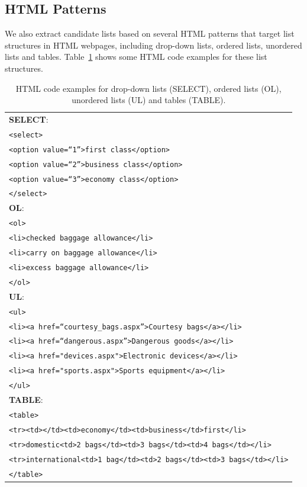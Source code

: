 \subsection{HTML Patterns}
We also extract candidate lists based on several HTML patterns that target list structures in HTML webpages, including drop-down lists, ordered lists, unordered lists and tables. Table~\ref{tab:facet-html} shows some HTML code examples for these list structures.
\begin{table}[ht!]
\centering
\caption{HTML code examples for drop-down lists (SELECT), ordered lists (OL), unordered lists (UL) and tables (TABLE).} 
\label{tab:facet-html}
\begin{tabular}{|l|} \hline
\textbf{SELECT}: \\
\texttt{<select>}\\
\texttt{<option value=``1''>first class</option>}\\
\texttt{<option value=``2''>business class</option>}\\
\texttt{<option value=``3''>economy class</option>}\\
\texttt{</select>}\\\hline
\textbf{OL}: \\
\texttt{<ol>}\\
\texttt{<li>checked baggage allowance</li>}\\
\texttt{<li>carry on baggage allowance</li>}\\
\texttt{<li>excess baggage allowance</li>}\\
\texttt{</ol>}\\\hline
\textbf{UL}: \\
\texttt{<ul>} \\
\texttt{<li><a href=``courtesy\_bags.aspx''>Courtesy bags</a></li>}\\
\texttt{<li><a href=``dangerous.aspx''>Dangerous goods</a></li>}\\
\texttt{<li><a href="devices.aspx">Electronic devices</a></li>}\\
\texttt{<li><a href="sports.aspx">Sports equipment</a></li>}\\
\texttt{</ul>}\\\hline
\textbf{TABLE}: \\
\texttt{<table>}\\
\texttt{\small<tr><td></td><td>economy</td><td>business</td>first</li>}\\
\texttt{\small<tr>domestic<td>2 bags</td><td>3 bags</td><td>4 bags</td></li>}\\
\texttt{\small<tr>international<td>1 bag</td><td>2 bags</td><td>3 bags</td></li>}\\
\texttt{\small</table>}\\\hline
\end{tabular}
\end{table}

